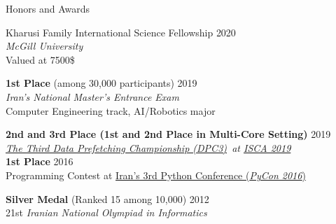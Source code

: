 \documentclass{resume}
\newcommand{\InternalSpace}{\vspace{0.18cm}}
\newcommand{\textapprox}{\raisebox{0.5ex}{\texttildelow}}
\newenvironment{MySection}[1]
{\begin{category}{#1}}
{\end{category}}
\newcommand{\MyItem}{\citembullet}
\def \ISCAXIX {\href{https://iscaconf.org/isca2019/}{ISCA 2019}}
\def \DPCIII  {\href{https://dpc3.compas.cs.stonybrook.edu/}{The Third Data Prefetching Championship (DPC3)}}
\begin{document}
\InternalSpace


\begin{MySection}{Honors and Awards}

\MyItem
Kharusi Family International Science Fellowship \hfill {2020}\\
\emph{McGill University}\\
Valued at 7500\$

\MyItem
\textbf{1st Place} (among \textapprox30,000 participants) \hfill {2019}\\
\emph{Iran's National Master's Entrance Exam}\\
Computer Engineering track, AI/Robotics major

\MyItem
\textbf{2nd and 3rd Place (1st and 2nd Place in Multi-Core Setting)} \hfill {2019}\\
\emph{\DPCIII\ at \ISCAXIX}\\

\MyItem
\textbf{1st Place} \hfill {2016}\\
Programming Contest at \href{http://www.pycon.ir}{Iran's 3rd Python Conference (\emph{PyCon 2016})}

\MyItem
\textbf{Silver Medal} (Ranked \textapprox15 among \textapprox10,000) \hfill {2012}\\
21st \emph{Iranian National Olympiad in Informatics}

\end{MySection}

\InternalSpace


\end{document}
